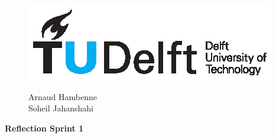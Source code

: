 \documentclass[11pt]{article}
\begin{document}
\thispagestyle{fancy}
\begin{figure}
    \begin{minipage}[H]{0.33\textwidth}
		\vspace{0.3cm}
		\includegraphics[scale=0.8]{img/TUDelftLogo.eps}
	\end{minipage}
	\begin{minipage}[H]{0.34\textwidth}
		\begin{center}
			\selectfont \textcolor{blue}{}
		\end{center}
		
	
	\end{minipage}
	\begin{minipage}[H]{0.33\textwidth}
			\begin{flushright}

				\small{Arnaud Hambenne }\\
				\small{Soheil Jahanshahi }\\
				

			\end{flushright}
			
	\end{minipage}
\end{figure}


\begin{minipage}[H]{\textwidth}
\vspace{0.3cm}
		\begin{center}
		
		\vspace{0.3cm}
			\Large{\selectfont \textbf{Reflection Sprint 1}}\\
		\vspace{0.3cm}	
		
		\vspace{0.7cm}	
		\end{center}
	\end{minipage}
\end{document}
